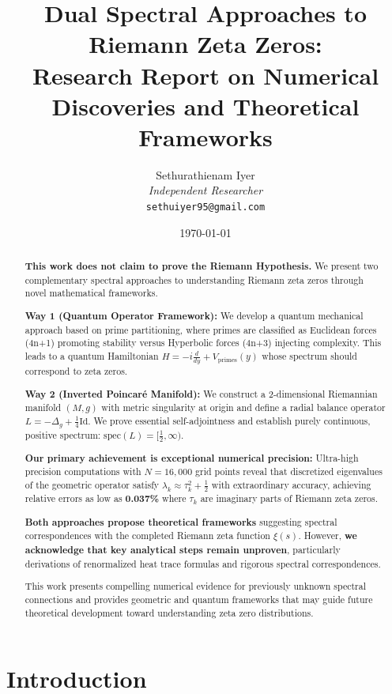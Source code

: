 \documentclass[12pt]{article}
\title{\textbf{Dual Spectral Approaches to Riemann Zeta Zeros:\\ Research Report on Numerical Discoveries and Theoretical Frameworks}}
\author{
Sethurathienam Iyer\\
\textit{Independent Researcher}\\
\texttt{sethuiyer95@gmail.com}
}
\date{\today}
\begin{document}
\maketitle

\begin{abstract}
\textbf{This work does not claim to prove the Riemann Hypothesis.} We present two complementary spectral approaches to understanding Riemann zeta zeros through novel mathematical frameworks.

\textbf{Way 1 (Quantum Operator Framework):} We develop a quantum mechanical approach based on prime partitioning, where primes are classified as Euclidean forces (4n+1) promoting stability versus Hyperbolic forces (4n+3) injecting complexity. This leads to a quantum Hamiltonian $H = -i\frac{d}{dy} + V_{\text{primes}}(y)$ whose spectrum should correspond to zeta zeros.

\textbf{Way 2 (Inverted Poincaré Manifold):} We construct a 2-dimensional Riemannian manifold $(M, g)$ with metric singularity at origin and define a radial balance operator $L = -\Delta_g + \frac{1}{4}\text{Id}$. We prove essential self-adjointness and establish purely continuous, positive spectrum: $\text{spec}(L) = [\tfrac{1}{2}, \infty)$.

\textbf{Our primary achievement is exceptional numerical precision:} Ultra-high precision computations with $N = 16{,}000$ grid points reveal that discretized eigenvalues of the geometric operator satisfy $\lambda_k \approx \tau_k^2 + \frac{1}{2}$ with extraordinary accuracy, achieving relative errors as low as \textbf{0.037\%} where $\tau_k$ are imaginary parts of Riemann zeta zeros.

\textbf{Both approaches propose theoretical frameworks} suggesting spectral correspondences with the completed Riemann zeta function $\xi(s)$. However, \textbf{we acknowledge that key analytical steps remain unproven}, particularly derivations of renormalized heat trace formulas and rigorous spectral correspondences.

This work presents compelling numerical evidence for previously unknown spectral connections and provides geometric and quantum frameworks that may guide future theoretical development toward understanding zeta zero distributions.
\end{abstract}

\section{Introduction}
\end{document}
